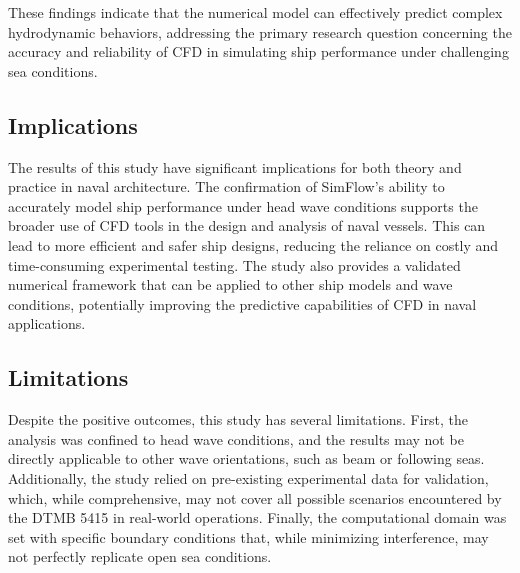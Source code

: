 \documentclass[12pt]{article} %
\begin{document}
These findings indicate that the numerical model can effectively predict complex hydrodynamic behaviors, addressing the primary research question 
concerning the accuracy and reliability of CFD in simulating ship performance under challenging sea conditions.


\subsection{Implications}
The results of this study have significant implications for both theory and practice in naval 
architecture. The confirmation of SimFlow's ability to accurately model ship performance 
under head wave conditions supports the broader use of CFD tools in the design and analysis of 
naval vessels. This can lead to more efficient and safer ship designs, reducing the reliance on 
costly and time-consuming experimental testing. The study also provides a validated numerical 
framework that can be applied to other ship models and wave conditions, potentially improving 
the predictive capabilities of CFD in naval applications.

\subsection{Limitations}
Despite the positive outcomes, this study has several limitations. First, the analysis was 
confined to head wave conditions, and the results may not be directly applicable to other wave 
orientations, such as beam or following seas. Additionally, the study relied on pre-existing 
experimental data for validation, which, while comprehensive, may not cover all possible 
scenarios encountered by the DTMB 5415 in real-world operations. Finally, the computational 
domain was set with specific boundary conditions that, while minimizing interference, may not 
perfectly replicate open sea conditions.
\end{document}
